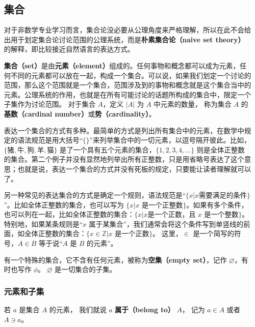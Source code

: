 

\subsection{集合}

对于非数学专业学习而言，集合论没必要从公理角度来严格理解，所以在此不会给出用于划定集合论讨论范围的公理系统，而是\textbf{朴素集合论（naive set theory）}的解释，即比较接近自然语言的表达方式。

\textbf{集合（set）}是由\textbf{元素（element）}组成的。任何事物和概念都可以成为元素，任何不同的元素都可以放在一起，构成一个集合。可以说，如果我们划定一个讨论的范围，那么这个范围就是一个集合，范围涉及到的事物和概念就是这个集合当中的元素。公理系统的作用，也就是在所有可能讨论的话题所构成的集合中，限定一个子集作为讨论范围。 对于集合 $A$，定义 $|A|$ 为 $A$ 中元素的数量， 称为集合 $A$ 的\textbf{基数（cardinal number）}或\textbf{势（cardinality）}。

表达一个集合的方式有多种。最简单的方式是列出所有集合中的元素，在数学中规定的语法规范是用大括号“$\{\}$”来列举集合中的一切元素，以逗号隔开彼此。比如，$\{\text{猪}, \text{牛}, \text{狗}, \text{羊}, \text{猫}\}$ 是了一个具有五个元素的集合，$\{1,2,3,4,\dots\}$ 则是全体正整数的集合。第二个例子并没有显然地列举出所有正整数，只是用省略号表达了这个意思；也就是说，表达一个集合的方式并没有死板的规定，只要能让读者理解就可以了。

另一种常见的表达集合的方式是确定一个规则，语法规范是“$\{x|x \text{需要满足的条件}\}$”。比如全体正整数的集合，也可以写为 $\{x|\text{$x$ 是一个正整数}\}$。如果有多个条件，也可以列在一起，比如全体正整数的集合：$\{x|x \text{是一个正数，且 $x$ 是一个整数}\}$。特别地，如果某条规则是“$x$ 属于某集合”，我们通常会将这个条件写到单竖线的前面，如全体正整数的集合：$\{x\in\mathbb{Z}|\text{$x$ 是一个正数}\}$。 这里，$\in$ 是一个简写的符号，$A\in B$ 等于说“$A$ 是 $B$ 的元素”。

有一个特殊的集合，它不含有任何元素，被称为\textbf{空集（empty set）}，记作 $\varnothing$，有时也写作 $\phi$。 $\varnothing$ 是一切集合的子集。

\subsubsection{元素和子集}
若 $a$ 是集合 $A$ 的元素， 我们就说 $a$ \textbf{属于（belong to）} $A$， 记为 $a \in A$ 或者 $A \ni a$。

